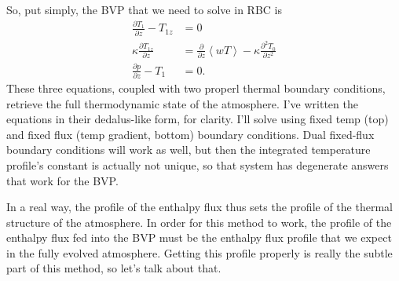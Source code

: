 \documentclass[aps, pre, onecolumn, nofootinbib, notitlepage, groupedaddress, amsfonts, amssymb, amsmath, longbibliography]{revtex4-1}
\newcommand{\angles}[1]{\ensuremath{\left\langle #1 \right\rangle}}
\begin{document}
\begin{enumerate}
So, put simply, the BVP that we need to solve in RBC is 
\begin{equation}
\begin{split}
\frac{\partial T_1}{\partial z} - T_{1z} &= 0 \\
\kappa \frac{\partial T_{1z}}{\partial z} &= \frac{\partial}{\partial z} \angles{w T}  - \kappa \frac{\partial^2 T_0}{\partial z^2}\\
\frac{\partial p}{\partial z} - T_1 &= 0.
\end{split}
\end{equation}
These three equations, coupled with two properl thermal boundary conditions, retrieve the full
thermodynamic state of the atmosphere.  I've written the equations in their dedalus-like form,
for clarity.  I'll solve using fixed temp (top) and fixed flux (temp gradient, bottom) boundary
conditions.  Dual fixed-flux boundary conditions will work as well, but then the integrated temperature
profile's constant is actually not unique, so that system has degenerate answers that work for
the BVP.

In a real way, the profile of the enthalpy flux thus sets the profile of the thermal structure of
the atmosphere.  In order for this method to work, the profile of the enthalpy flux fed into the
BVP must be the enthalpy flux profile that we expect in the fully evolved atmosphere.  Getting
this profile properly is really the subtle part of this method, so let's talk about that.



\end{enumerate}
\end{document}
